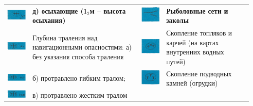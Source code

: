 \documentclass[a4paper, 12pt, twoside, final, book, russian, fittopage, cyremdash]{ncc}
\begin{document}
\begin{longtable}{M|m{0.2\textwidth}|M|m{0.2\textwidth}}
  \midrule
  \includegraphics[scale=1.3]{APP-2-A-21} & д) осыхающие ($1_2$м \--- высота осыхания) &
  \includegraphics[scale=1.3]{APP-2-A-29} & Рыболовные сети и заколы \\
  \midrule
  \includegraphics[scale=1.3]{APP-2-A-22} & Глубина траления над навигационными опасностями: \newline а) без указания способа траления &
  \includegraphics[scale=1.3]{APP-2-A-30} & Скопление топляков и карчей (на картах внутренних водных путей) \\
  \midrule
  \includegraphics[scale=1.3]{APP-2-A-23} & б) протравлено гибким тралом; &
  \includegraphics[scale=1.3]{APP-2-A-31} & Скопление подводных камней (огрудки) \\
  \midrule
  \includegraphics[scale=1.3]{APP-2-A-24} & в) протравлено жестким тралом &

\end{longtable}
\end{document}
